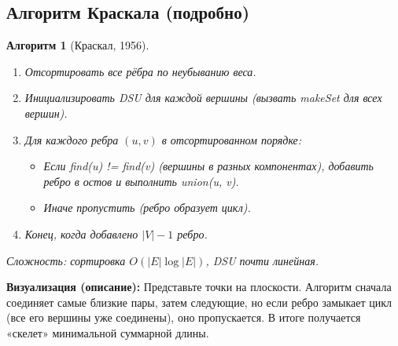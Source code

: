 \documentclass[12pt]{article}
\newtheorem{algorithm}{Алгоритм}
\begin{document}
\begin{enumerate}
\subsection{Алгоритм Краскала (подробно)}
\begin{algorithm}[Краскал, 1956]
    \begin{enumerate}
        \item Отсортировать все рёбра по неубыванию веса.
        \item Инициализировать DSU для каждой вершины (вызвать makeSet для всех вершин).
        \item Для каждого ребра \((u,v)\) в отсортированном порядке:
            \begin{itemize}
                \item Если find(u) != find(v) (вершины в разных компонентах), добавить ребро в остов и выполнить union(u, v).
                \item Иначе пропустить (ребро образует цикл).
            \end{itemize}
        \item Конец, когда добавлено \(|V|-1\) ребро.
    \end{enumerate}
    Сложность: сортировка \(O(|E|\log|E|)\), DSU почти линейная.
\end{algorithm}
\textbf{Визуализация (описание):} Представьте точки на плоскости. Алгоритм сначала соединяет самые близкие пары, затем следующие, но если ребро замыкает цикл (все его вершины уже соединены), оно пропускается. В итоге получается «скелет» минимальной суммарной длины.


\end{enumerate}
\end{document}

